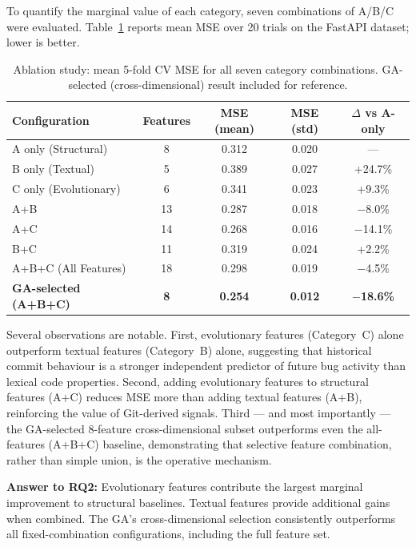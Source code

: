 \documentclass[11pt,a4paper]{article}
\begin{document}
To quantify the marginal value of each category, seven combinations of
A/B/C were evaluated. Table~\ref{tab:ablation} reports mean MSE over 20
trials on the FastAPI dataset; lower is better.

\begin{table}[!htbp]
\centering
\caption{Ablation study: mean 5-fold CV MSE for all seven category combinations.
         GA-selected (cross-dimensional) result included for reference.}
\label{tab:ablation}
\renewcommand{\arraystretch}{1.2}
\begin{tabular}{@{}lcccc@{}}
\toprule
\textbf{Configuration} & \textbf{Features} &
\textbf{MSE (mean)} & \textbf{MSE (std)} & \textbf{$\Delta$ vs A-only} \\
\midrule
\rowcolor{structcol!10}
A only (Structural)          & 8  & 0.312 & 0.020 & --- \\
\rowcolor{textcol!10}
B only (Textual)             & 5  & 0.389 & 0.027 & +24.7\% \\
\rowcolor{evolcol!10}
C only (Evolutionary)        & 6  & 0.341 & 0.023 & +9.3\% \\
A+B                          & 13 & 0.287 & 0.018 & $-$8.0\% \\
A+C                          & 14 & 0.268 & 0.016 & $-$14.1\% \\
B+C                          & 11 & 0.319 & 0.024 & +2.2\% \\
A+B+C (All Features)         & 18 & 0.298 & 0.019 & $-$4.5\% \\
\midrule
\rowcolor{gacol!15}
\textbf{GA-selected (A+B+C)} & \textbf{8} & \textbf{0.254} & \textbf{0.012}
  & $-$\textbf{18.6\%} \\
\bottomrule
\end{tabular}
\end{table}

Several observations are notable. First, evolutionary features (Category~C)
alone outperform textual features (Category~B) alone, suggesting that historical
commit behaviour is a stronger independent predictor of future bug activity than
lexical code properties. Second, adding evolutionary features to structural
features (A+C) reduces MSE more than adding textual features (A+B), reinforcing
the value of Git-derived signals. Third --- and most importantly --- the
GA-selected 8-feature cross-dimensional subset outperforms even the all-features
(A+B+C) baseline, demonstrating that selective feature combination, rather than
simple union, is the operative mechanism.

\textbf{Answer to RQ2:} Evolutionary features contribute the largest marginal
improvement to structural baselines. Textual features provide additional gains
when combined. The GA's cross-dimensional selection consistently outperforms
all fixed-combination configurations, including the full feature set.
\end{document}
